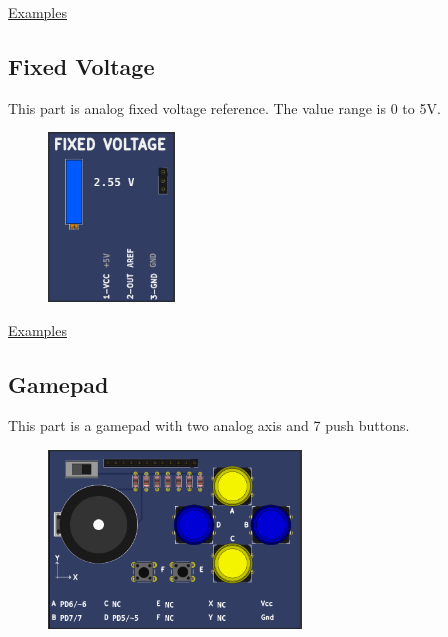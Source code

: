\href{https://lcgamboa.github.io/picsimlab_examples/parts_FM50_(Temperature).html}{Examples}

\vspace{0.5cm}

\subsection{Fixed Voltage}

This part is analog fixed voltage reference. The value range is 0 to 5V.

\begin{figure}[H]
\center
\includegraphics[width=0.3\textwidth]{img/part_fixedv.png} 
\end{figure} 


\href{https://lcgamboa.github.io/picsimlab_examples/parts_Fixed_Voltage.html}{Examples}

 
\subsection{Gamepad}

This part is a gamepad with two analog axis and 7 push buttons.

\begin{figure}[H]
\center
\includegraphics[width=0.6\textwidth]{img/part_gamepad.png} 
\end{figure} 


